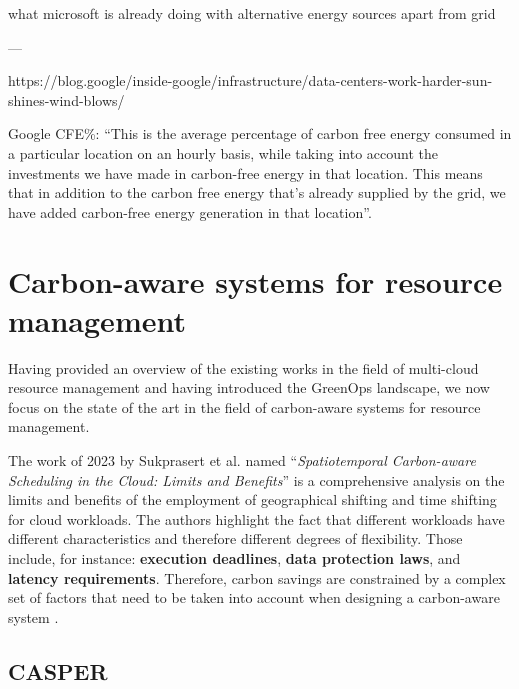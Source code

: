 what microsoft is already doing with alternative energy sources apart from grid


---

https://blog.google/inside-google/infrastructure/data-centers-work-harder-sun-shines-wind-blows/

Google CFE\%: “This is the average percentage of carbon free energy consumed in a particular location on an hourly basis, while taking into account the investments we have made in carbon-free energy in that location. This means that in addition to the carbon free energy that's already supplied by the grid, we have added carbon-free energy generation in that location”.

\section{Carbon-aware systems for resource management}

Having provided an overview of the existing works in the field of multi-cloud resource management and having introduced the GreenOps landscape, we now focus on the state of the art in the field of carbon-aware systems for resource management.

The work of 2023 by Sukprasert et al. named ``\textit{Spatiotemporal Carbon-aware Scheduling in the Cloud: Limits and Benefits}'' \cite{10.1145/3599733.3606301} is a comprehensive analysis on the limits and benefits of the employment of geographical shifting and time shifting for cloud workloads.
The authors highlight the fact that different workloads have different characteristics and therefore different degrees of flexibility. Those include, for instance: \textbf{execution deadlines}, \textbf{data protection laws}, and \textbf{latency requirements}. Therefore, carbon savings are constrained by a complex set of factors that need to be taken into account when designing a carbon-aware system \cite{10.1145/3599733.3606301}.

\subsection{CASPER}

